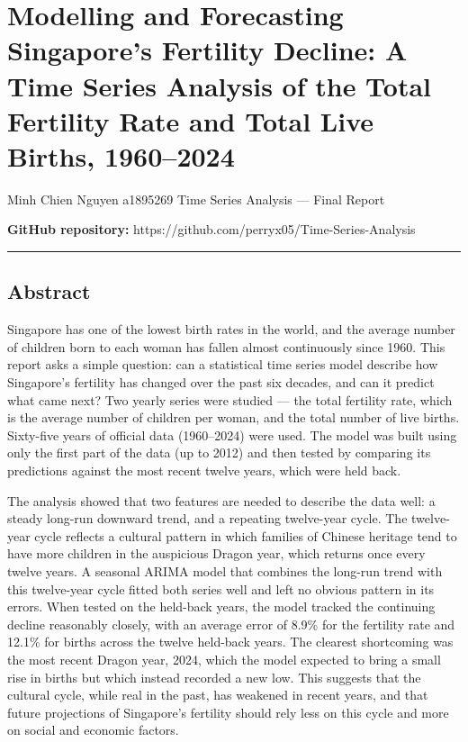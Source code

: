 \documentclass[
  11pt,
]{article}
\author{}
\date{}
\begin{document}
\section{Modelling and Forecasting Singapore's Fertility Decline: A Time
Series Analysis of the Total Fertility Rate and Total Live Births,
1960--2024}\label{modelling-and-forecasting-singapores-fertility-decline-a-time-series-analysis-of-the-total-fertility-rate-and-total-live-births-19602024}

Minh Chien Nguyen \textbar{} a1895269 Time Series Analysis --- Final
Report

\textbf{GitHub repository:}
https://github.com/perryx05/Time-Series-Analysis

\begin{center}\rule{0.5\linewidth}{0.5pt}\end{center}

\subsection{Abstract}\label{abstract}

Singapore has one of the lowest birth rates in the world, and the
average number of children born to each woman has fallen almost
continuously since 1960. This report asks a simple question: can a
statistical time series model describe how Singapore's fertility has
changed over the past six decades, and can it predict what came next?
Two yearly series were studied --- the total fertility rate, which is
the average number of children per woman, and the total number of live
births. Sixty-five years of official data (1960--2024) were used. The
model was built using only the first part of the data (up to 2012) and
then tested by comparing its predictions against the most recent twelve
years, which were held back.

The analysis showed that two features are needed to describe the data
well: a steady long-run downward trend, and a repeating twelve-year
cycle. The twelve-year cycle reflects a cultural pattern in which
families of Chinese heritage tend to have more children in the
auspicious Dragon year, which returns once every twelve years. A
seasonal ARIMA model that combines the long-run trend with this
twelve-year cycle fitted both series well and left no obvious pattern in
its errors. When tested on the held-back years, the model tracked the
continuing decline reasonably closely, with an average error of 8.9\%
for the fertility rate and 12.1\% for births across the twelve held-back
years. The clearest shortcoming was the most recent Dragon year, 2024,
which the model expected to bring a small rise in births but which
instead recorded a new low. This suggests that the cultural cycle, while
real in the past, has weakened in recent years, and that future
projections of Singapore's fertility should rely less on this cycle and
more on social and economic factors.
\end{document}
